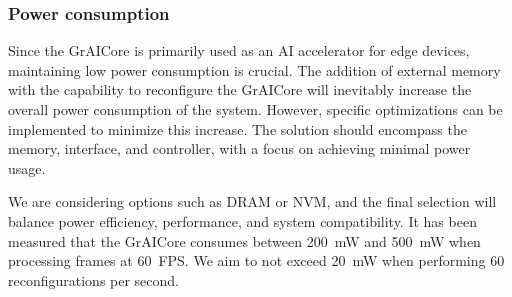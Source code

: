 \subsubsection{Power consumption}
Since the GrAICore is primarily used as an AI accelerator for edge devices, maintaining low power consumption is crucial.
The addition of external memory with the capability to reconfigure the GrAICore will inevitably increase the overall power consumption of the system.
However, specific optimizations can be implemented to minimize this increase.
The solution should encompass the memory, interface, and controller, with a focus on achieving minimal power usage.

We are considering options such as DRAM or NVM, and the final selection will balance power efficiency, performance, and system compatibility.
It has been measured that the GrAICore consumes between \SI{200}{mW} and \SI{500}{mW} when processing frames at \SI{60}{FPS}.
We aim to not exceed \SI{20}{mW} when performing 60 reconfigurations per second.

